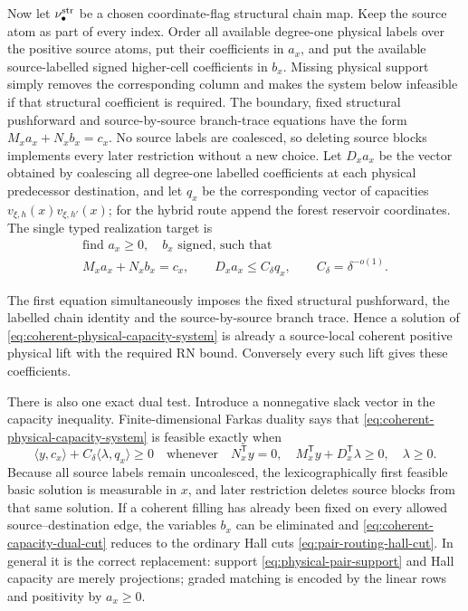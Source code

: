 \documentclass[11pt]{article}
\begin{document}
Now let \(\nu_\bullet^{\rm str}\) be a chosen coordinate-flag structural chain
map.  Keep the source atom as part of every index.  Order all available
degree-one physical labels over the positive source atoms, put their
coefficients in \(a_x\), and put the available source-labelled signed
higher-cell coefficients in \(b_x\).  Missing physical support simply removes
the corresponding column and makes the system below infeasible if that
structural coefficient is required.  The
boundary, fixed structural pushforward and source-by-source branch-trace
equations have the form \(M_xa_x+N_xb_x=c_x\).  No source labels are
coalesced, so deleting source blocks implements every later restriction
without a new choice.
Let \(D_xa_x\) be the vector obtained by coalescing all degree-one labelled
coefficients at each physical predecessor destination, and let \(q_x\) be the
corresponding vector of capacities
\(v_{\xi,h}(x)v_{\xi,h'}(x)\); for the hybrid route append the forest
reservoir coordinates.  The single typed realization target is
\begin{equation}\label{eq:coherent-physical-capacity-system}
 \boxed{
 \begin{gathered}
  \text{find }a_x\ge0,\quad b_x\text{ signed, such that}\\
  M_xa_x+N_xb_x=c_x,\qquad
  D_xa_x\le C_\delta q_x,\qquad C_\delta=\delta^{-o(1)} .
 \end{gathered}}
\end{equation}

The first equation simultaneously imposes the fixed structural pushforward,
the labelled chain identity and the source-by-source branch trace.  Hence a
solution of \eqref{eq:coherent-physical-capacity-system} is already a
source-local coherent positive physical lift with the required RN bound.
Conversely every such lift gives these coefficients.

There is also one exact dual test.  Introduce a nonnegative slack vector in the
capacity inequality.  Finite-dimensional Farkas duality says that
\eqref{eq:coherent-physical-capacity-system} is feasible exactly when
\begin{equation}\label{eq:coherent-capacity-dual-cut}
 \boxed{
  \langle y,c_x\rangle
   +C_\delta\langle\lambda,q_x\rangle\ge0
  \quad\text{whenever}\quad
  N_x^{\mathsf T}y=0,\quad
  M_x^{\mathsf T}y+D_x^{\mathsf T}\lambda\ge0,\quad
  \lambda\ge0.}
\end{equation}
Because all source labels remain uncoalesced, the lexicographically first
feasible basic solution is measurable in \(x\), and later restriction deletes
source blocks from that same solution.  If a coherent filling has already
been fixed on every allowed source--destination edge, the variables \(b_x\)
can be eliminated and \eqref{eq:coherent-capacity-dual-cut} reduces to the
ordinary Hall cuts \eqref{eq:pair-routing-hall-cut}.  In general it is the
correct replacement: support \eqref{eq:physical-pair-support} and Hall
capacity are merely projections; graded matching is encoded by the linear rows
and positivity by \(a_x\ge0\).
\end{document}
